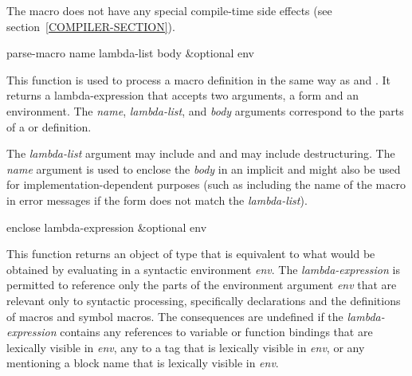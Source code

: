 \begin{newer}
\begin{defmac}
  The  macro does not have any special compile-time
  side effects (see section~\ref{COMPILER-SECTION}).
\end{defmac}

\begin{defun}[Function]
parse-macro name lambda-list body &optional env

  This function is used to process a macro definition in the same way
  as  and .  It returns a lambda-expression that accepts
  two arguments, a form and an environment.  The \emph{name}, \emph{lambda-list},
  and \emph{body} arguments correspond to the parts of a  or 
  definition.

  The \emph{lambda-list} argument may include  and 
  and may include destructuring.
  The \emph{name}
  argument is used to enclose the \emph{body} in an implicit  and might also
  be used for implementation-dependent purposes (such as including the name of
  the macro in error messages if the form does not match the \emph{lambda-list}).
\end{defun}

\begin{defun}[Function]
enclose lambda-expression &optional env

  This function returns an object of type  that is equivalent to what
  would be obtained by evaluating 
  in a syntactic
  environment \emph{env}.  The \emph{lambda-expression} is permitted to reference only the
  parts of the environment argument \emph{env} that are relevant only to syntactic
  processing, specifically declarations and the definitions of macros and
  symbol macros.  The consequences are undefined if the \emph{lambda-expression}
  contains any references to variable or function bindings that are 
  lexically visible in \emph{env}, any  to a tag that is lexically visible in 
  \emph{env}, or any  mentioning a block name that is lexically 
  visible in \emph{env}.
\end{defun}  
\end{newer}
